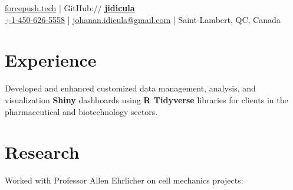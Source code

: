 \documentclass[]{jidicula-resume}
\begin{document}
\lastupdated


{ \href{http://bit.ly/jidicula-site}{forcepush.tech}
  | GitHub:// \href{http://bit.ly/jidicula_github}{\bf jidicula} \\
  \href{tel:14506265558}{+1-450-626-5558}
  | \href{mailto:johanan.idicula+resume@gmail.com}{johanan.idicula@gmail.com}
  | Saint-Lambert, QC, Canada}

\section{Experience}

\vspace{\topsep} %
\begin{tightemize}
\item Developed and enhanced customized data management, analysis, and
  visualization \textbf{Shiny} dashboards using \textbf{R Tidyverse} libraries
  for clients in the pharmaceutical and biotechnology sectors.
\end{tightemize}
\sectionsep

\section{Research}
Worked with Professor Allen Ehrlicher on cell mechanics projects:
\end{document}
